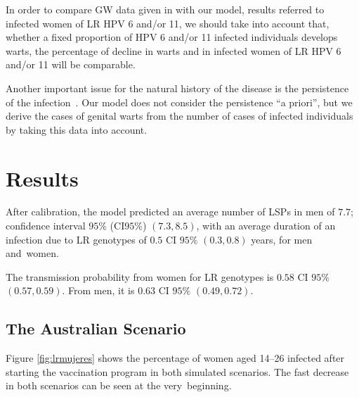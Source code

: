 In order to compare GW data given in \cite{Ali} with our model, results referred to infected women of LR HPV 6 and/or 11, we should take into account that, whether a fixed proportion of HPV 6 and/or 11 infected individuals develops warts, the percentage of decline in warts and in infected women of LR HPV 6 and/or 11 will be comparable. 

Another important issue for the natural history of the disease is the persistence of the infection~\cite{AJE2014}. Our model does not consider the persistence ``a priori'', but we derive the cases of genital warts from the number of cases of infected individuals by taking this data into account.

\section{Results}

After calibration, the model predicted an average number of LSPs in men of $7.7$; {confidence interval $95\%$} (CI$95\%$) 
$(7.3,8.5)$, with an average duration of an infection due to LR genotypes of $0.5$ CI $95\%$ $(0.3, 0.8)$ years, for men and~women. 

The transmission probability from women for LR genotypes is $0.58$ CI $95\%$ $(0.57, 0.59)$. From men, it is $0.63$ CI $95\%$ $(0.49, 0.72)$. 

\subsection*{The Australian Scenario}

Figure \ref{fig:lrmujeres} shows the percentage of women aged 14--26 infected after starting the vaccination program in both simulated scenarios. The fast decrease in both scenarios can be seen at the very~beginning.
\vspace{-24pt}

